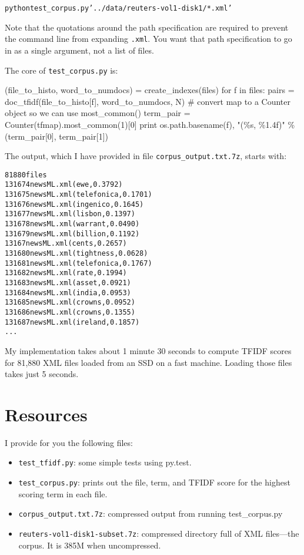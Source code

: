 \begin{fullwidth}
\begin{alltt}
python test_corpus.py '../data/reuters-vol1-disk1/*.xml'
\end{alltt}

\noindent Note that the quotations around the path specification are required to prevent the command line from expanding {\tt *.xml}. You want that path specification to go in as a single argument, not a list of files.

The core of {\tt test\_corpus.py} is:

\begin{pyverbatim}
(file_to_histo, word_to_numdocs) = create_indexes(files)
for f in files:
    pairs = doc_tfidf(file_to_histo[f], word_to_numdocs, N)
    # convert map to a Counter object so we can use most_common()
    term_pair = Counter(tfmap).most_common(1)[0]
    print os.path.basename(f), "(\%s, \%1.4f)" \% (term_pair[0], term_pair[1])
\end{pyverbatim}

\noindent The output, which I have provided in file {\tt corpus\_output.txt.7z}, starts with:

\begin{alltt}
81880 files
131674newsML.xml (ewe, 0.3792)
131675newsML.xml (telefonica, 0.1701)
131676newsML.xml (ingenico, 0.1645)
131677newsML.xml (lisbon, 0.1397)
131678newsML.xml (warrant, 0.0490)
131679newsML.xml (billion, 0.1192)
13167newsML.xml (cents, 0.2657)
131680newsML.xml (tightness, 0.0628)
131681newsML.xml (telefonica, 0.1767)
131682newsML.xml (rate, 0.1994)
131683newsML.xml (asset, 0.0921)
131684newsML.xml (india, 0.0953)
131685newsML.xml (crowns, 0.0952)
131686newsML.xml (crowns, 0.1355)
131687newsML.xml (ireland, 0.1857)
...
\end{alltt}

My implementation takes about 1 minute 30 seconds to compute TFIDF scores for 81,880 XML files loaded from an SSD on a fast machine.  Loading those files takes just 5 seconds.
 
\section{Resources}

I provide for you the following files:

\begin{itemize}
\item {\tt test\_tfidf.py}: some simple tests using py.test.
\item {\tt test\_corpus.py}: prints out the file, term, and TFIDF score for the highest scoring term in each file.
\item {\tt corpus\_output.txt.7z}: compressed output from running test\_corpus.py
\item {\tt reuters-vol1-disk1-subset.7z}: compressed directory full of XML files---the corpus. It is 385M when uncompressed.
\end{itemize}


\end{fullwidth}
